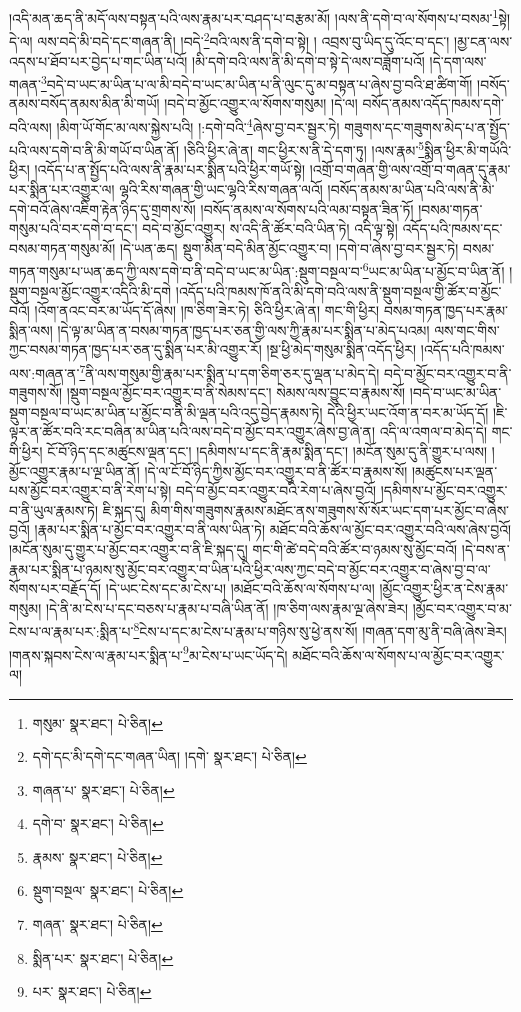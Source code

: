 །འདི་མན་ཆད་ནི་མདོ་ལས་བསྟན་པའི་ལས་རྣམ་པར་བཤད་པ་བརྩམ་མོ། །ལས་ནི་དགེ་བ་ལ་སོགས་པ་བསམ་\footnote{གསུམ་  སྣར་ཐང་།  པེ་ཅིན། }སྟེ། དེ་ལ། ལས་བདེ་མི་བདེ་དང་གཞན་ནི། །བདེ་\footnote{དགེ་དང་མི་དགེ་དང་གཞན་ཡིན། །དགེ་  སྣར་ཐང་།  པེ་ཅིན། }བའི་ལས་ནི་དགེ་བ་སྟེ། །
འབྲས་བུ་ཡིད་དུ་འོང་བ་དང་། །མྱ་ངན་ལས་འདས་པ་ཐོབ་པར་བྱེད་པ་གང་ཡིན་པའོ། །མི་དགེ་བའི་ལས་ནི་མི་དགེ་བ་སྟེ་དེ་ལས་བཟློག་པའོ། །དེ་དག་ལས་གཞན་\footnote{གཞན་པ་  སྣར་ཐང་།  པེ་ཅིན། }བདེ་བ་ཡང་མ་ཡིན་པ་ལ་མི་བདེ་བ་ཡང་མ་ཡིན་པ་ནི་ལུང་དུ་མ་བསྟན་པ་ཞེས་བྱ་བའི་ཐ་ཚིག་གོ། །བསོད་ནམས་བསོད་ནམས་མིན་མི་གཡོ། །བདེ་བ་མྱོང་འགྱུར་ལ་སོགས་གསུམ། །དེ་ལ། བསོད་ནམས་འདོད་ཁམས་དགེ་བའི་ལས། །མིག་ཡོ་གོང་མ་ལས་སྐྱེས་པའི། །:དགེ་བའི་\footnote{དགེ་བ་  སྣར་ཐང་།  པེ་ཅིན། }ཞེས་བྱ་བར་སྦྱར་ཏེ། གཟུགས་དང་གཟུགས་མེད་པ་ན་སྤྱོད་པའི་ལས་དགེ་བ་ནི་མི་གཡོ་བ་ཡིན་ནོ། །ཅིའི་ཕྱིར་ཞེ་ན། གང་ཕྱིར་ས་ནི་དེ་དག་ཏུ། །ལས་རྣམ་\footnote{རྣམས་  སྣར་ཐང་།  པེ་ཅིན། }སྨིན་ཕྱིར་མི་གཡོའི་ཕྱིར། །འདོད་པ་ན་སྤྱོད་པའི་ལས་ནི་རྣམ་པར་སྨིན་པའི་ཕྱིར་གཡོ་སྟེ། །འགྲོ་བ་གཞན་གྱི་ལས་འགྲོ་བ་གཞན་དུ་རྣམ་པར་སྨིན་པར་འགྱུར་ལ། ལྷའི་རིས་གཞན་གྱི་ཡང་ལྷའི་རིས་གཞན་ལའོ། །བསོད་ནམས་མ་ཡིན་པའི་ལས་ནི་མི་དགེ་བའོ་ཞེས་འཇིག་རྟེན་ཉིད་དུ་གྲགས་སོ། །བསོད་ནམས་ལ་སོགས་པའི་ལམ་བསྟན་ཟིན་ཏོ། །བསམ་གཏན་གསུམ་པའི་བར་དགེ་བ་དང་། བདེ་བ་མྱོང་འགྱུར། ས་འདི་ནི་ཚོར་བའི་ཡིན་ཏེ། འདི་ལྟ་སྟེ། འདོད་པའི་ཁམས་དང་བསམ་གཏན་གསུམ་མོ། །དེ་ཡན་ཆད། སྡུག་མིན་བདེ་མིན་མྱོང་འགྱུར་བ། །དགེ་བ་ཞེས་བྱ་བར་སྦྱར་ཏེ། བསམ་གཏན་གསུམ་པ་ཡན་ཆད་ཀྱི་ལས་དགེ་བ་ནི་བདེ་བ་ཡང་མ་ཡིན་:སྡུག་བསྔལ་བ་\footnote{སྡུག་བསྔལ་  སྣར་ཐང་།  པེ་ཅིན། }ཡང་མ་ཡིན་པ་མྱོང་བ་ཡིན་ནོ། །སྡུག་བསྔལ་མྱོང་འགྱུར་འདིའི་མི་དགེ །འདོད་པའི་ཁམས་ཁོ་ནའི་མི་དགེ་བའི་ལས་ནི་སྡུག་བསྔལ་གྱི་ཚོར་བ་མྱོང་བའོ། །འོག་ནའང་བར་མ་ཡོད་དོ་ཞེས། །ཁ་ཅིག་ཟེར་ཏེ། ཅིའི་ཕྱིར་ཞེ་ན། གང་གི་ཕྱིར། བསམ་གཏན་ཁྱད་པར་རྣམ་སྨིན་ལས། །དེ་ལྟ་མ་ཡིན་ན་བསམ་གཏན་ཁྱད་པར་ཅན་གྱི་ལས་ཀྱི་རྣམ་པར་སྨིན་པ་མེད་པའམ། ལས་གང་གིས་ཀྱང་བསམ་གཏན་ཁྱད་པར་ཅན་དུ་སྨིན་པར་མི་འགྱུར་རོ། །སྔ་ཕྱི་མེད་གསུམ་སྨིན་འདོད་ཕྱིར། །འདོད་པའི་ཁམས་ལས་:གཞན་ན་\footnote{གཞན་  སྣར་ཐང་།  པེ་ཅིན། }ནི་ལས་གསུམ་གྱི་རྣམ་པར་སྨིན་པ་དག་ཅིག་ཅར་དུ་ལྡན་པ་མེད་དེ། བདེ་བ་མྱོང་བར་འགྱུར་བ་ནི་གཟུགས་སོ། །སྡུག་བསྔལ་མྱོང་བར་འགྱུར་བ་ནི་སེམས་དང་། སེམས་ལས་བྱུང་བ་རྣམས་སོ། །བདེ་བ་ཡང་མ་ཡིན་སྡུག་བསྔལ་བ་ཡང་མ་ཡིན་པ་མྱོང་བ་ནི་མི་ལྡན་པའི་འདུ་བྱེད་རྣམས་ཏེ། དེའི་ཕྱིར་ཡང་འོག་ན་བར་མ་ཡོད་དོ། །ཇི་ལྟར་ན་ཚོར་བའི་རང་བཞིན་མ་ཡིན་པའི་ལས་བདེ་བ་མྱོང་བར་འགྱུར་ཞེས་བྱ་ཞེ་ན། འདི་ལ་འགལ་བ་མེད་དེ། གང་གི་ཕྱིར། ངོ་བོ་ཉིད་དང་མཚུངས་ལྡན་དང་། །དམིགས་པ་དང་ནི་རྣམ་སྨིན་དང་། །མངོན་སུམ་དུ་ནི་གྱུར་པ་ལས། །མྱོང་འགྱུར་རྣམ་པ་ལྔ་ཡིན་ནོ། །དེ་ལ་ངོ་བོ་ཉིད་ཀྱིས་མྱོང་བར་འགྱུར་བ་ནི་ཚོར་བ་རྣམས་སོ། །མཚུངས་པར་ལྡན་པས་མྱོང་བར་འགྱུར་བ་ནི་རེག་པ་སྟེ། བདེ་བ་མྱོང་བར་འགྱུར་བའི་རེག་པ་ཞེས་བྱའོ། །དམིགས་པ་མྱོང་བར་འགྱུར་བ་ནི་ཡུལ་རྣམས་ཏེ། ཇི་སྐད་དུ། མིག་གིས་གཟུགས་རྣམས་མཐོང་ནས་གཟུགས་སོ་སོར་ཡང་དག་པར་མྱོང་བ་ཞེས་བྱའོ། །རྣམ་པར་སྨིན་པ་མྱོང་བར་འགྱུར་བ་ནི་ལས་ཡིན་ཏེ། མཐོང་བའི་ཆོས་ལ་མྱོང་བར་འགྱུར་བའི་ལས་ཞེས་བྱའོ། །མངོན་སུམ་དུ་གྱུར་པ་མྱོང་བར་འགྱུར་བ་ནི་ཇི་སྐད་དུ། གང་གི་ཚེ་བདེ་བའི་ཚོར་བ་ཉམས་སུ་མྱོང་བའོ། །དེ་བས་ན་རྣམ་པར་སྨིན་པ་ཉམས་སུ་མྱོང་བར་འགྱུར་བ་ཡིན་པའི་ཕྱིར་ལས་ཀྱང་བདེ་བ་མྱོང་བར་འགྱུར་བ་ཞེས་བྱ་བ་ལ་སོགས་པར་བརྗོད་དོ། །དེ་ཡང་ངེས་དང་མ་ངེས་པ། །མཐོང་བའི་ཆོས་ལ་སོགས་པ་ལ། །མྱོང་འགྱུར་ཕྱིར་ན་ངེས་རྣམ་གསུམ། །དེ་ནི་མ་ངེས་པ་དང་བཅས་པ་རྣམ་པ་བཞི་ཡིན་ནོ། །ཁ་ཅིག་ལས་རྣམ་ལྔ་ཞེས་ཟེར། །མྱོང་བར་འགྱུར་བ་མ་ངེས་པ་ལ་རྣམ་པར་:སྨིན་པ་\footnote{སྨིན་པར་  སྣར་ཐང་།  པེ་ཅིན། }ངེས་པ་དང་མ་ངེས་པ་རྣམ་པ་གཉིས་སུ་ཕྱེ་ནས་སོ། །གཞན་དག་མུ་ནི་བཞི་ཞེས་ཟེར། །གནས་སྐབས་ངེས་ལ་རྣམ་པར་སྨིན་པ་\footnote{པར་  སྣར་ཐང་།  པེ་ཅིན། }མ་ངེས་པ་ཡང་ཡོད་དེ། མཐོང་བའི་ཆོས་ལ་སོགས་པ་ལ་མྱོང་བར་འགྱུར་ལ། 
